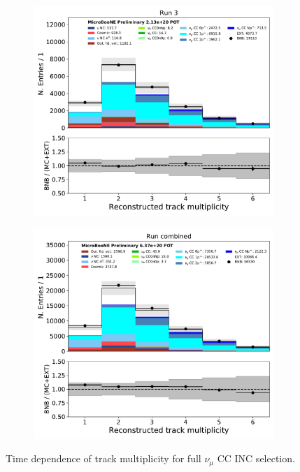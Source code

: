 \begin{figure}[H]
\begin{center}
\begin{subfigure}[b]{0.35\textwidth}
    \end{subfigure}
    \begin{subfigure}[b]{0.35\textwidth}
        \centering
        \includegraphics[width=1.00\textwidth]{NuMuCCsel/Images/Ryan/Run3_nocrt/reco_ntrack_08052020_full_samples_longest_noCRT_event_category.pdf}
    \end{subfigure} %
    \begin{subfigure}[b]{0.35\textwidth}
        \centering
        \includegraphics[width=1.00\textwidth]{NuMuCCsel/Images/Ryan/combined/reco_ntrack_08052020_full_samples_longest_noCRT_event_category.pdf}
    \end{subfigure}
\caption{Time dependence of track multiplicity for full $\nu_{\mu}$ CC INC selection.}
\label{fig:NuMuCCsel:timedep:ntrack}
\end{center}
\end{figure}

